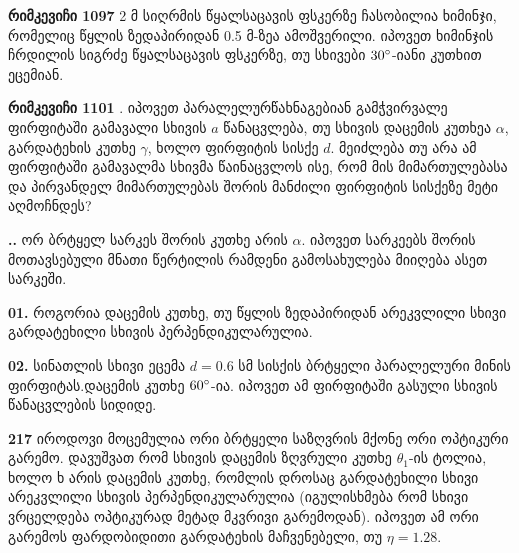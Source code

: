 \documentclass[a4paper]{book}
\begin{document}
\textbf{რიმკევიჩი 1097} 2 მ სიღრმის წყალსაცავის ფსკერზე ჩასობილია ხიმინჯი, რომელიც წყლის ზედაპირიდან 0.5 მ-ზეა ამოშვერილი. იპოვეთ ხიმინჯის ჩრდილის სიგრძე წყალსაცავის ფსკერზე, თუ სხივები $30 \degree$-იანი კუთხით ეცემიან.

\textbf{რიმკევიჩი 1101} . იპოვეთ პარალელურწახნაგებიან გამჭვირვალე ფირფიტაში გამავალი სხივის $a$ წანაცვლება, თუ სხივის დაცემის კუთხეა $\alpha$, გარდატეხის კუთხე $\gamma$, ხოლო ფირფიტის სისქე $d$. მეიძლება თუ არა ამ ფირფიტაში გამავალმა სხივმა წაინაცვლოს ისე, რომ მის მიმართულებასა და პირვანდელ მიმართულებას შორის მანძილი ფირფიტის სისქეზე მეტი აღმოჩნდეს?

\textbf{..} 
ორ ბრტყელ სარკეს შორის კუთხე არის $\alpha$. იპოვეთ სარკეებს შორის მოთავსებული მნათი წერტილის რამდენი გამოსახულება მიიღება ასეთ სარკეში.

\textbf{01.}
როგორია დაცემის კუთხე, თუ წყლის ზედაპირიდან არეკვლილი სხივი გარდატეხილი სხივის პერპენდიკულარულია.

\textbf{02.}
სინათლის სხივი ეცემა $d = 0.6$ სმ სისქის ბრტყელი პარალელური მინის ფირფიტას.დაცემის კუთხე $60 \degree$-ია. იპოვეთ ამ ფირფიტაში გასული სხივის წანაცვლების სიდიდე.

\textbf{217}
იროდოვი 
მოცემულია ორი ბრტყელი საზღვრის მქონე ორი ოპტიკური გარემო. დავუშვათ რომ სხივის დაცემის ზღვრული კუთხე $\theta_1$-ის ტოლია, ხოლო ხ არის დაცემის კუთხე, რომლის დროსაც გარდატეხილი სხივი არეკვლილი სხივის პერპენდიკულარულია (იგულისხმება რომ სხივი ვრცელდება ოპტიკურად მეტად მკვრივი გარემოდან). იპოვეთ ამ ორი გარემოს ფარდობიდითი გარდატეხის მაჩვენებელი, თუ $\eta = 1.28$.
\end{document}
